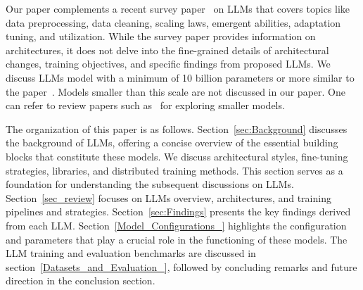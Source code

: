 Our paper complements a recent survey paper~\cite{Survey_LLM} on LLMs that covers topics like data preprocessing, data cleaning, scaling laws, emergent abilities, adaptation tuning, and utilization. While the survey paper provides information on architectures, it does not delve into the fine-grained details of architectural changes, training objectives, and specific findings from proposed LLMs. 
We discuss LLMs model with a minimum of 10 billion parameters or more similar to the paper~\cite{Survey_LLM}. Models smaller than this scale are not discussed in our paper. One can refer to review papers such as~\cite{survey_smaller_LLMs_1, survey_smaller_LLMs_2, survey_1} for exploring smaller models.


     

The organization of this paper is as follows. Section~\ref{sec:Background} discusses the background of LLMs, offering a concise overview of the essential building blocks that constitute these models. We discuss architectural styles, fine-tuning strategies, libraries, and distributed training methods. This section serves as a foundation for understanding the subsequent discussions on LLMs. Section~\ref{sec_review} focuses on LLMs overview, architectures, and training pipelines and strategies. Section~\ref{sec:Findings} presents the key findings derived from each LLM. Section~\ref{Model_Configurations_} highlights the configuration and parameters that play a crucial role in the functioning of these models. The LLM training and evaluation benchmarks are discussed in section~\ref{Datasets_and_Evaluation_}, followed by concluding remarks and future direction in the conclusion section.